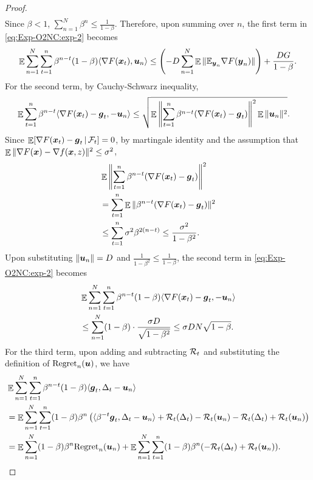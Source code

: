 \begin{proof}
\begin{align*}
\end{align*}
Since $\beta<1$, $\sum_{n=1}^N \beta^n \le \frac{1}{1-\beta}$. Therefore, upon summing over $n$, the first term in \eqref{eq:Exp-O2NC:exp-2} becomes
\begin{align}
    \mathop{\mathbb{E}}\sum_{n=1}^N\sum_{t=1}^n \beta^{n-t}(1-\beta) \langle \nabla F({\boldsymbol{x}}_t), {\boldsymbol{u}}_n\rangle 
    \le \left(-D\sum_{n=1}^N \mathop{\mathbb{E}} \|\mathbb{E}_{{\boldsymbol{y}}_n} \nabla F({\boldsymbol{y}}_n)\| \right) + \frac{DG}{1-\beta}.
    \label{eq:Exp-O2NC:exp-2a}
\end{align}
For the second term, by Cauchy-Schwarz inequality,
\begin{align*}
    \mathop{\mathbb{E}} \sum_{t=1}^n \beta^{n-t} \langle \nabla F({\boldsymbol{x}}_t)-{\boldsymbol{g}}_t, -{\boldsymbol{u}}_n\rangle
    &\le \sqrt{\mathop{\mathbb{E}} \left\| \sum_{t=1}^n \beta^{n-t}(\nabla F({\boldsymbol{x}}_t)-{\boldsymbol{g}}_t) \right\|^2 \mathop{\mathbb{E}}\|{\boldsymbol{u}}_n\|^2}.
\end{align*}
Since $\mathop{\mathbb{E}}[\nabla F({\boldsymbol{x}}_t)-{\boldsymbol{g}}_t \,|\, {\cal F}_t] = 0$, by martingale identity and the assumption that $\mathop{\mathbb{E}}\|\nabla F({\boldsymbol{x}})-\nabla f({\boldsymbol{x}},z)\|^2 \le\sigma^2$,
\begin{align*}
    &\mathop{\mathbb{E}} \left\| \sum_{t=1}^n \beta^{n-t}(\nabla F({\boldsymbol{x}}_t)-{\boldsymbol{g}}_t) \right\|^2 \\
    &= \sum_{t=1}^n \mathop{\mathbb{E}}\|\beta^{n-t}(\nabla F({\boldsymbol{x}}_t)-{\boldsymbol{g}}_t)\|^2 \\
    &\le \sum_{t=1}^n \sigma^2 \beta^{2(n-t)}
    \le \frac{\sigma^2}{1-\beta^2}.
\end{align*}
Upon substituting $\|{\boldsymbol{u}}_n\|=D$ and $\frac{1}{1-\beta^2}\le \frac{1}{1-\beta}$, the second term in \eqref{eq:Exp-O2NC:exp-2} becomes
\begin{align}
    &\mathop{\mathbb{E}}\sum_{n=1}^N\sum_{t=1}^n \beta^{n-t}(1-\beta) \langle \nabla F({\boldsymbol{x}}_t) - {\boldsymbol{g}}_t, -{\boldsymbol{u}}_n\rangle \notag\\
    &\le \sum_{n=1}^N (1-\beta) \cdot \frac{\sigma D}{\sqrt{1-\beta^2}}
    \le \sigma DN\sqrt{1-\beta}.
    \label{eq:Exp-O2NC:exp-2b}
\end{align}
For the third term, upon adding and subtracting ${\cal R}_t$ and substituting the definition of $\mathrm{Regret}_n({\boldsymbol{u}})$, we have
\begin{align}
    &\E\sum_{n=1}^N\sum_{t=1}^n \beta^{n-t}(1-\beta) \langle \vecg_t,\Delta_t-\vecu_n\rangle \notag\\
    &= \E\sum_{n=1}^N\sum_{t=1}^n (1-\beta)\beta^n \left( \langle \beta^{-t}\vecg_t,\Delta_t-\vecu_n\rangle + \calR_t(\Delta_t) - \calR_t(\vecu_n) - \calR_t(\Delta_t)+\calR_t(\vecu_n) \right) \notag\\
    &= \E\sum_{n=1}^N (1-\beta)\beta^n \regret_n(\vecu_n) + \E\sum_{n=1}^N\sum_{t=1}^n (1-\beta)\beta^n ( -\calR_t(\Delta_t) + \calR_t(\vecu_n)).

\end{align}
\end{proof}

